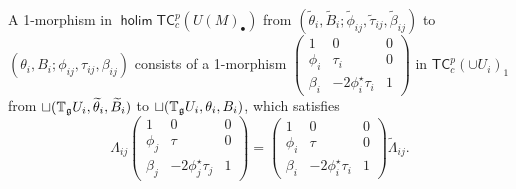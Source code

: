 \documentclass[letterpaper,10pt, oneside]{article} %
\newcommand{\tcalgdp}{{\mathsf{TC}^{p}_{c}}} %
\DeclareMathOperator{\holim}{\mathsf{holim}}
\newcommand{\tagui}{{\mathbb{T}_\g U_i}}
\begin{document}
A 1-morphism in $\holim \tcalgdp(U(M)_\bullet)$ from  $(\widetilde{\theta}_i, \widetilde{B}_i; \widetilde{\phi}_{ij}, \widetilde{\tau}_{ij}, \widetilde{\beta}_{ij}) $  to  $(\theta_i, B_i;\phi_{ij},\tau_{ij},\beta_{ij}) $ consists of
  a 1-morphism $\left(\begin{array}{ccc}
1&0&0\\
\phi_i&\tau_i&0\\
\beta_i&-2\phi_i^\star\tau_i&1
\end{array}\right)$  in $\tcalgdp(\cup U_i)_1$ from $\sqcup (\tagui,
  \widetilde{\theta}_i, \widetilde{B}_i) $ to $\sqcup (\tagui,
  \theta_i, B_i)$, which satisfies
  \begin{equation}\label{eq:gluetcam}
    \Lambda_{ij}\left(\begin{array}{ccc}
1&0&0\\
\phi_j&\tau&0\\
\beta_j&-2\phi_j^\star\tau_j&1
\end{array}\right)=\left(\begin{array}{ccc}
1&0&0\\
\phi_i&\tau&0\\
\beta_i&-2\phi_i^\star\tau_i&1
\end{array}\right)\widetilde{\Lambda}_{ij}.
  \end{equation}
\end{document}
